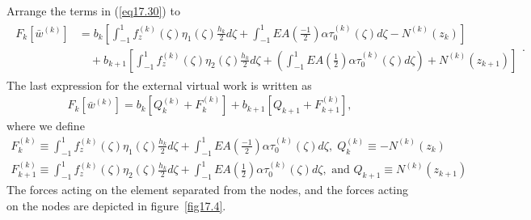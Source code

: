 \documentclass{AeroStructure-ERJohnson}
\begin{document}
\noindent Arrange the terms in (\ref{eq17.30}) to
\begin{align}\label{eq17.32}
\begin{aligned}F_{k}\left[\bar{w}^{(k)}\right]&= b_{k}\left[\int_{-1}^{1} f_{z}^{(k)}(\zeta) \eta_{1}(\zeta) \frac{h_{k}}{2} d \zeta+\int_{-1}^{1} E A\left(\frac{-1}{2}\right) \alpha \tau_{0}^{(k)}(\zeta) d \zeta-N^{(k)}\left(z_{k}\right)\right] \\
&\quad + b_{k+1}\left[\int_{-1}^{1} f_{z}^{(k)}(\zeta) \eta_{2}(\zeta) \frac{h_{k}}{2} d \zeta+\left(\int_{-1}^{1} E A\left(\frac{1}{2}\right) \alpha \tau_{0}^{(k)}(\zeta) d \zeta\right)+N^{(k)}\left(z_{k+1}\right)\right]\end{aligned}.
\end{align}
The last expression for the external virtual work is written as
\begin{align}\label{eq17.33}
F_{k}\left[\bar{w}^{(k)}\right]=b_{k}\left[Q_{k}^{(k)}+F_{k}^{(k)}\right]+b_{k+1}\left[Q_{k+1}+F_{k+1}^{(k)}\right],
\end{align}
where we define
\begin{gather}
F_{k}^{(k)} \equiv \int_{-1}^{1} f_{z}^{(k)}(\zeta) \eta_{1}(\zeta) \frac{h_{k}}{2} d \zeta+\int_{-1}^{1} E A\left(\frac{-1}{2}\right) \alpha \tau_{0}^{(k)}(\zeta) d \zeta,\; Q_{k}^{(k)} \equiv-N^{(k)}\left(z_{k}\right) \label{eq17.34} \\
F_{k+1}^{(k)} \equiv \int_{-1}^{1} f_{z}^{(k)}(\zeta) \eta_{2}(\zeta) \frac{h_{k}}{2} d \zeta+\int_{-1}^{1} E A\left(\frac{1}{2}\right) \alpha \tau_{0}^{(k)}(\zeta) d \zeta, \textrm{ and } Q_{k+1} \equiv N^{(k)}\left(z_{k+1}\right) \label{eq17.35}
\end{gather}
The forces acting on the element separated from the nodes, and the forces acting on the nodes are depicted in figure~\ref{fig17.4}.

{\def\thefigure{17.4}
}
\end{document}
